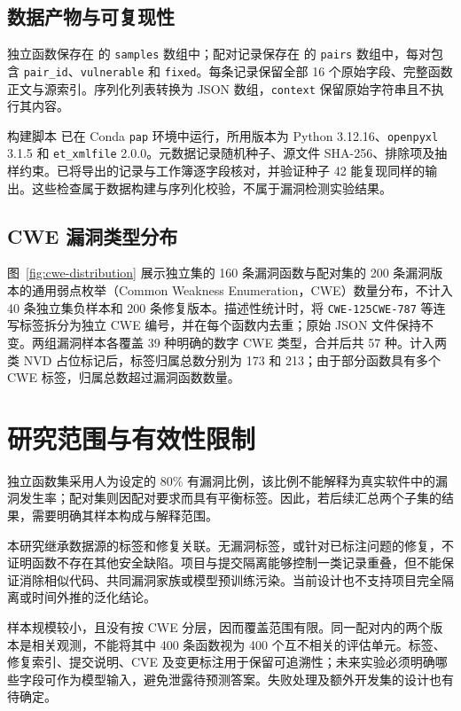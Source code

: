 \documentclass[conference]{IEEEtran}
\begin{document}
\subsection{数据产物与可复现性}
独立函数保存在  的 \texttt{samples} 数组中；配对记录保存在  的 \texttt{pairs} 数组中，每对包含 \texttt{pair\_id}、\texttt{vulnerable} 和 \texttt{fixed}。每条记录保留全部 16 个原始字段、完整函数正文与源索引。序列化列表转换为 JSON 数组，\texttt{context} 保留原始字符串且不执行其内容。

构建脚本  已在 Conda \texttt{pap} 环境中运行，所用版本为 Python 3.12.16、\texttt{openpyxl} 3.1.5 和 \texttt{et\_xmlfile} 2.0.0。元数据记录随机种子、源文件 SHA-256、排除项及抽样约束。已将导出的记录与工作簿逐字段核对，并验证种子 42 能复现同样的输出。这些检查属于数据构建与序列化校验，不属于漏洞检测实验结果。

\subsection{CWE 漏洞类型分布}
图~\ref{fig:cwe-distribution} 展示独立集的 160 条漏洞函数与配对集的 200 条漏洞版本的通用弱点枚举（Common Weakness Enumeration，CWE）数量分布，不计入 40 条独立集负样本和 200 条修复版本。描述性统计时，将 \texttt{CWE-125CWE-787} 等连写标签拆分为独立 CWE 编号，并在每个函数内去重；原始 JSON 文件保持不变。两组漏洞样本各覆盖 39 种明确的数字 CWE 类型，合并后共 57 种。计入两类 NVD 占位标记后，标签归属总数分别为 173 和 213；由于部分函数具有多个 CWE 标签，归属总数超过漏洞函数数量。

\balance
\section{研究范围与有效性限制}
独立函数集采用人为设定的 80\% 有漏洞比例，该比例不能解释为真实软件中的漏洞发生率；配对集则因配对要求而具有平衡标签。因此，若后续汇总两个子集的结果，需要明确其样本构成与解释范围。

本研究继承数据源的标签和修复关联。无漏洞标签，或针对已标注问题的修复，不证明函数不存在其他安全缺陷。项目与提交隔离能够控制一类记录重叠，但不能保证消除相似代码、共同漏洞家族或模型预训练污染。当前设计也不支持项目完全隔离或时间外推的泛化结论。

样本规模较小，且没有按 CWE 分层，因而覆盖范围有限。同一配对内的两个版本是相关观测，不能将其中 400 条函数视为 400 个互不相关的评估单元。标签、修复索引、提交说明、CVE 及变更标注用于保留可追溯性；未来实验必须明确哪些字段可作为模型输入，避免泄露待预测答案。失败处理及额外开发集的设计也有待确定。
\end{document}

